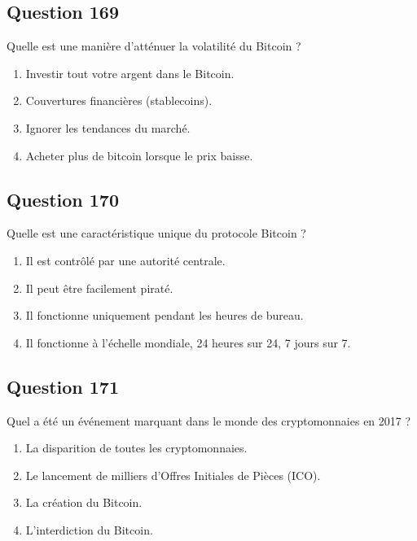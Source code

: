 \documentclass[12pt,a4paper]{article}
\begin{document}
\bigskip


\subsection*{Question 169}
Quelle est une manière d'atténuer la volatilité du Bitcoin ?

\begin{enumerate}[label=\Alph*., leftmargin=*]
\item Investir tout votre argent dans le Bitcoin.
\item Couvertures financières (stablecoins).
\item Ignorer les tendances du marché.
\item Acheter plus de bitcoin lorsque le prix baisse.
\end{enumerate}

\bigskip


\subsection*{Question 170}
Quelle est une caractéristique unique du protocole Bitcoin ?

\begin{enumerate}[label=\Alph*., leftmargin=*]
\item Il est contrôlé par une autorité centrale.
\item Il peut être facilement piraté.
\item Il fonctionne uniquement pendant les heures de bureau.
\item Il fonctionne à l'échelle mondiale, 24 heures sur 24, 7 jours sur 7.
\end{enumerate}

\bigskip


\subsection*{Question 171}
Quel a été un événement marquant dans le monde des cryptomonnaies en 2017 ?

\begin{enumerate}[label=\Alph*., leftmargin=*]
\item La disparition de toutes les cryptomonnaies.
\item Le lancement de milliers d'Offres Initiales de Pièces (ICO).
\item La création du Bitcoin.
\item L'interdiction du Bitcoin.
\end{enumerate}
\end{document}
